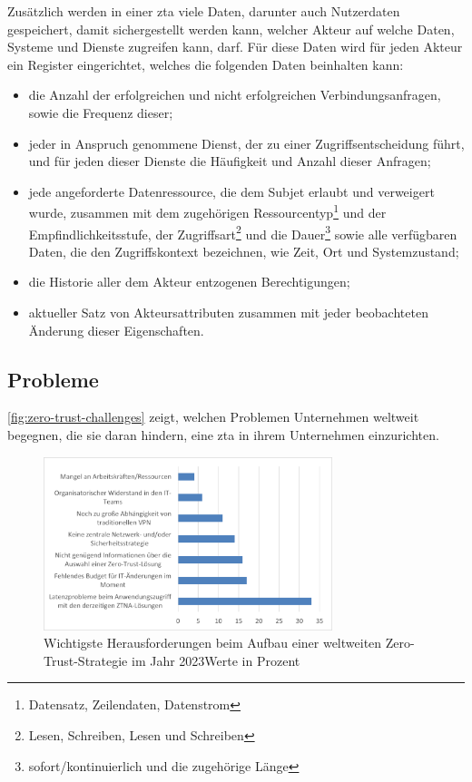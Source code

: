 Zusätzlich werden in einer \ac{zta} viele Daten, darunter auch Nutzerdaten gespeichert, damit sichergestellt werden kann, welcher Akteur auf welche Daten, Systeme und Dienste zugreifen kann, \bzw darf.
Für diese Daten wird für jeden Akteur ein Register eingerichtet, welches die folgenden Daten beinhalten kann\autocite[\vglf][]{colombo-2021}:
\begin{itemize}
    \item die Anzahl der erfolgreichen und nicht erfolgreichen Verbindungsanfragen, sowie die Frequenz dieser;
    \item jeder in Anspruch genommene Dienst, der zu einer Zugriffsentscheidung führt, und für jeden dieser Dienste die Häufigkeit und Anzahl dieser Anfragen;
    \item jede angeforderte Datenressource, die dem Subjet erlaubt und verweigert wurde, zusammen mit dem zugehörigen Ressourcentyp\footnote{\zb Datensatz, Zeilendaten, Datenstrom} und der Empfindlichkeitsstufe, der Zugriffsart\footnote{\zb Lesen, Schreiben, Lesen und Schreiben} und die Dauer\footnote{\zb sofort/kontinuierlich und die zugehörige Länge} sowie alle verfügbaren Daten, die den Zugriffskontext bezeichnen, wie \zb Zeit, Ort und Systemzustand;
    \item die Historie aller dem Akteur entzogenen Berechtigungen;
    \item aktueller Satz von Akteursattributen zusammen mit jeder beobachteten Änderung dieser Eigenschaften.
\end{itemize}

\subsection{Probleme}\label{subsec:probleme}
\autoref{fig:zero-trust-challenges} zeigt, welchen Problemen Unternehmen weltweit begegnen, die sie daran hindern, eine \ac{zta} in ihrem Unternehmen einzurichten.\autocite[\vglf][]{fortinet-2023}
\begin{figure}[htbp]
    \centering
    \includegraphics[width=0.75\textwidth, trim = {0.2cm 0.3cm 0.4cm 0.25cm}, clip]{src/abbildungen/Herausforderungen_ZeroTrust}
    \captionsetup{width=\linewidth, format=hang}
    \caption[Wichtigste Herausforderungen beim Aufbau einer weltweiten Zero-Trust-Strategie im Jahr 2023]{Wichtigste Herausforderungen beim Aufbau einer weltweiten Zero-Trust-Strategie im Jahr 2023\newline Werte in Prozent}
    \label{fig:zero-trust-challenges}
\end{figure}

